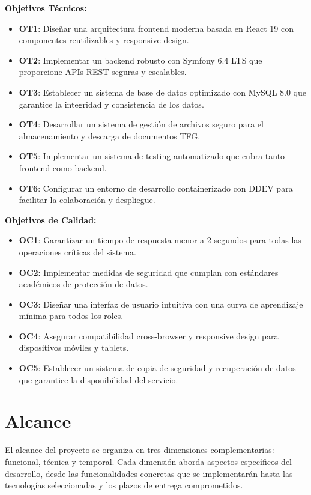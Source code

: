 \documentclass[12pt,a4paper,oneside]{report}
\providecommand{\tightlist}{%
  \setlength{\itemsep}{0pt}\setlength{\parskip}{0pt}}
\begin{document}
\textbf{Objetivos Técnicos:}

\begin{itemize}
\tightlist
\item
  \textbf{OT1}: Diseñar una arquitectura frontend moderna basada en
  React 19 con componentes reutilizables y responsive design.
\item
  \textbf{OT2}: Implementar un backend robusto con Symfony 6.4 LTS que
  proporcione APIs REST seguras y escalables.
\item
  \textbf{OT3}: Establecer un sistema de base de datos optimizado con
  MySQL 8.0 que garantice la integridad y consistencia de los datos.
\item
  \textbf{OT4}: Desarrollar un sistema de gestión de archivos seguro
  para el almacenamiento y descarga de documentos TFG.
\item
  \textbf{OT5}: Implementar un sistema de testing automatizado que cubra
  tanto frontend como backend.
\item
  \textbf{OT6}: Configurar un entorno de desarrollo containerizado con
  DDEV para facilitar la colaboración y despliegue.
\end{itemize}

\textbf{Objetivos de Calidad:}

\begin{itemize}
\tightlist
\item
  \textbf{OC1}: Garantizar un tiempo de respuesta menor a 2 segundos
  para todas las operaciones críticas del sistema.
\item
  \textbf{OC2}: Implementar medidas de seguridad que cumplan con
  estándares académicos de protección de datos.
\item
  \textbf{OC3}: Diseñar una interfaz de usuario intuitiva con una curva
  de aprendizaje mínima para todos los roles.
\item
  \textbf{OC4}: Asegurar compatibilidad cross-browser y responsive
  design para dispositivos móviles y tablets.
\item
  \textbf{OC5}: Establecer un sistema de copia de seguridad y recuperación de datos
  que garantice la disponibilidad del servicio.
\end{itemize}

\section{Alcance}\label{alcance}

El alcance del proyecto se organiza en tres dimensiones complementarias: funcional, técnica y temporal. Cada dimensión aborda aspectos específicos del desarrollo, desde las funcionalidades concretas que se implementarán hasta las tecnologías seleccionadas y los plazos de entrega comprometidos.
\end{document}
